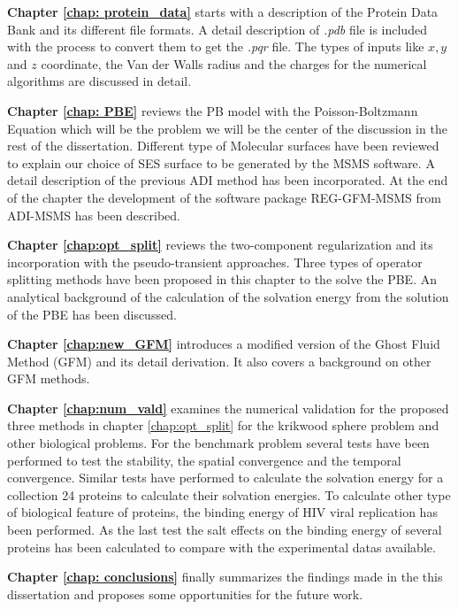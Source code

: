 {\bf Chapter \ref{chap: protein_data}} starts with a description of the Protein Data Bank and its different file formats. A detail description of {\it .pdb} file is included with the process to convert them to get the {\it .pqr} file. The types of inputs like $x,y$ and $z$  coordinate, the Van der Walls radius and the charges for the numerical algorithms are discussed in detail. 

{\bf Chapter \ref{chap: PBE}} reviews the PB model with the Poisson-Boltzmann Equation which will be the problem we will be the center of the discussion in the rest of the dissertation. Different type of Molecular surfaces have been reviewed to explain our choice of SES surface to be generated by the MSMS software. A detail description of the previous ADI method \cite{Geng2013_Fully} has been incorporated. At the end of the chapter the development of the software package REG-GFM-MSMS from ADI-MSMS has been described. 

{\bf Chapter \ref{chap:opt_split}} reviews the two-component regularization and its incorporation with the pseudo-transient approaches. Three types of operator splitting methods have been proposed in this chapter to the solve the PBE. An analytical background of the calculation of the solvation energy from the solution of the PBE has been discussed.

{\bf Chapter \ref{chap:new_GFM}} introduces a modified version of the Ghost Fluid Method (GFM) and its detail derivation. It also covers a background on other GFM methods.

{\bf Chapter \ref{chap:num_vald}} examines the numerical validation for the proposed three methods in chapter \ref{chap:opt_split} for the krikwood sphere problem and other biological problems. For the benchmark problem  several tests have been performed to test the stability, the spatial convergence and the temporal convergence. Similar tests have performed to calculate the solvation energy for a collection 24 proteins to calculate their solvation energies. To calculate other type of biological feature of proteins, the binding energy of HIV viral replication has been performed. As the last test the salt effects on the binding energy of several proteins has been calculated to compare with the experimental datas available.    

{\bf Chapter \ref{chap: conclusions}} finally summarizes the findings made in the this dissertation and proposes some opportunities for the future work.  
